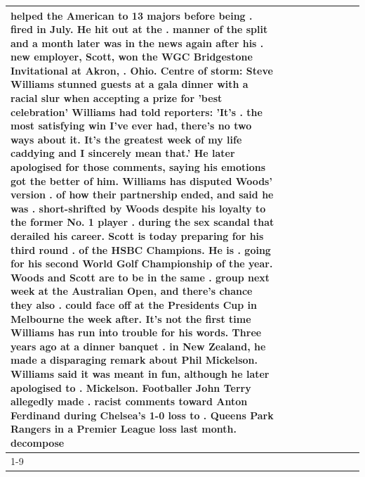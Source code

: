 \begin{table}[H]
\begin{tabular}{lllrlllll}
helped the American to 13 majors before being . fired in July. He hit out at the . manner of the split and a month later was in the news again after his . new employer, Scott, won the WGC Bridgestone Invitational at Akron, . Ohio. Centre of storm: Steve Williams stunned guests at a gala dinner with a racial slur when accepting a prize for 'best celebration' Williams had told reporters: 'It's . the most satisfying win I've ever had, there's no two ways about it. It's the greatest week of my life caddying and I sincerely mean that.' He later apologised for those comments, saying his emotions got the better of him. Williams has disputed Woods' version . of how their partnership ended, and said he was . short-shrifted by Woods despite his loyalty to the former No. 1 player . during the sex scandal that derailed his career. Scott is today preparing for his third round . of the HSBC Champions. He is . going for his second World Golf Championship of the year. Woods and Scott are to be in the same . group next week at the Australian Open, and there's chance they also . could face off at the Presidents Cup in Melbourne the week after. It's not the first time Williams has run into trouble for his words. Three years ago at a dinner banquet . in New Zealand, he made a disparaging remark about Phil Mickelson. Williams said it was meant in fun, although he later apologised to . Mickelson. Footballer John Terry allegedly made . racist comments toward Anton Ferdinand during Chelsea's 1-0 loss to . Queens Park Rangers in a Premier League loss last month. decompose \\
\cline{1-9}

\end{tabular}
\end{table}
